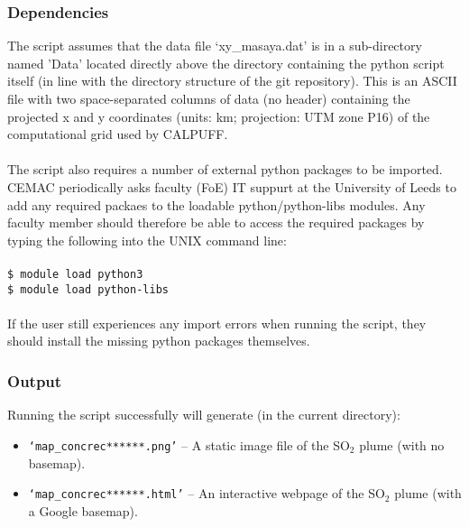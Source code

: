 \documentclass[10pt,a4paper]{article}
\newcommand\tab[1][0.5cm]{\hspace*{#1}}
\begin{document}
\subsubsection{Dependencies}
The script assumes that the data file `xy\_masaya.dat' is in a sub-directory named 'Data' located directly above the directory containing the python script itself (in line with the directory structure of the git repository). This is an ASCII file with two space-separated columns of data (no header) containing the projected x and y coordinates (units: km; projection: UTM zone P16) of the computational grid used by CALPUFF.\\\\
The script also requires a number of external python packages to be imported. CEMAC periodically asks faculty (FoE) IT suppurt at the University of Leeds to add any required packaes to the loadable python/python-libs modules. Any faculty member should therefore be able to access the required packages by typing the following into the UNIX command line:\\\\
\tab \texttt{\$ module load python3}\\
\tab \texttt{\$ module load python-libs}\\\\
If the user still experiences any import errors when running the script, they should install the missing python packages themselves.

\subsubsection{Output}
Running the script successfully will generate (in the current directory):
\begin{itemize}
\item \texttt{`map\_concrec******.png'} -- A static image file of the SO$_2$ plume (with no basemap).
\item \texttt{`map\_concrec******.html'} -- An interactive webpage of the SO$_2$ plume (with a Google basemap).
\end{itemize}
\end{document}
